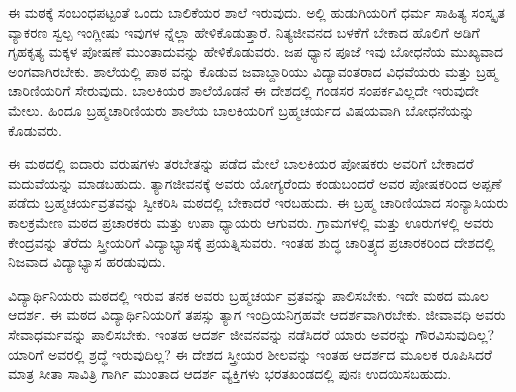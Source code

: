 ಈ ಮಠಕ್ಕೆ ಸಂಬಂಧಪಟ್ಟಂತೆ ಒಂದು ಬಾಲಿಕೆಯರ ಶಾಲೆ ಇರುವುದು. ಅಲ್ಲಿ ಹುಡುಗಿಯರಿಗೆ ಧರ್ಮ ಸಾಹಿತ್ಯ ಸಂಸ್ಕೃತ ವ್ಯಾಕರಣ ಸ್ವಲ್ಪ ಇಂಗ್ಲೀಷು ಇವುಗಳ ನ್ನೆಲ್ಲಾ ಹೇಳಿಕೊಡುತ್ತಾರೆ. ನಿತ್ಯಜೀವನದ ಬಳಕೆಗೆ ಬೇಕಾದ ಹೊಲಿಗೆ ಅಡಿಗೆ ಗೃಹಕೃತ್ಯ ಮಕ್ಕಳ ಪೋಷಣೆ ಮುಂತಾದುವನ್ನು ಹೇಳಿಕೊಡುವರು. ಜಪ ಧ್ಯಾನ ಪೂಜೆ ಇವು ಬೋಧನೆಯ ಮುಖ್ಯವಾದ ಅಂಗವಾಗಿರಬೇಕು. ಶಾಲೆಯಲ್ಲಿ ಪಾಠ ವನ್ನು ಕೊಡುವ ಜವಾಬ್ದಾರಿಯು ವಿದ್ಯಾವಂತರಾದ ವಿಧವೆಯರು ಮತ್ತು ಬ್ರಹ್ಮ ಚಾರಿಣಿಯರಿಗೆ ಸೇರುವುದು. ಬಾಲಕಿಯರ ಶಾಲೆಯೊಡನೆ ಈ ದೇಶದಲ್ಲಿ ಗಂಡಸರ ಸಂಪರ್ಕವಿಲ್ಲದೇ ಇರುವುದೇ ಮೇಲು. ಹಿಂದೂ ಬ್ರಹ್ಮಚಾರಿಣಿಯರು ಶಾಲೆಯ ಬಾಲಕಿಯರಿಗೆ ಬ್ರಹ್ಮಚರ್ಯದ ವಿಷಯವಾಗಿ ಬೋಧನೆಯನ್ನು ಕೊಡುವರು.

ಈ ಮಠದಲ್ಲಿ ಐದಾರು ವರುಷಗಳು ತರಬೇತನ್ನು ಪಡೆದ ಮೇಲೆ ಬಾಲಕಿಯರ ಪೋಷಕರು ಅವರಿಗೆ ಬೇಕಾದರೆ ಮದುವೆಯನ್ನು ಮಾಡಬಹುದು. ತ್ಯಾಗಜೀವನಕ್ಕೆ ಅವರು ಯೋಗ್ಯರೆಂದು ಕಂಡುಬಂದರೆ ಅವರ ಪೋಷಕರಿಂದ ಅಪ್ಪಣೆ ಪಡೆದು ಬ್ರಹ್ಮಚರ್ಯವ್ರತವನ್ನು ಸ್ವೀಕರಿಸಿ ಮಠದಲ್ಲಿ ಬೇಕಾದರೆ ಇರಬಹುದು. ಈ ಬ್ರಹ್ಮ ಚಾರಿಣಿಯಾದ ಸಂನ್ಯಾಸಿಯರು ಕಾಲಕ್ರಮೇಣ ಮಠದ ಪ್ರಚಾರಕರು ಮತ್ತು ಉಪಾ ಧ್ಯಾಯರು ಆಗುವರು. ಗ್ರಾಮಗಳಲ್ಲಿ ಮತ್ತು ಊರುಗಳಲ್ಲಿ ಅವರು ಕೇಂದ್ರವನ್ನು ತೆರೆದು ಸ್ತ್ರೀಯರಿಗೆ ವಿದ್ಯಾಭ್ಯಾಸಕ್ಕೆ ಪ್ರಯತ್ನಿಸುವರು. ಇಂತಹ ಶುದ್ಧ ಚಾರಿತ್ರ್ಯದ ಪ್ರಚಾರಕರಿಂದ ದೇಶದಲ್ಲಿ ನಿಜವಾದ ವಿದ್ಯಾಭ್ಯಾಸ ಹರಡುವುದು.

ವಿದ್ಯಾರ್ಥಿನಿಯರು ಮಠದಲ್ಲಿ ಇರುವ ತನಕ ಅವರು ಬ್ರಹ್ಮಚರ್ಯ ವ್ರತವನ್ನು ಪಾಲಿಸಬೇಕು. ಇದೇ ಮಠದ ಮೂಲ ಆದರ್ಶ. ಈ ಮಠದ ವಿದ್ಯಾರ್ಥಿನಿಯರಿಗೆ ತಪಸ್ಸು ತ್ಯಾಗ ಇಂದ್ರಿಯನಿಗ್ರಹವೇ ಆದರ್ಶವಾಗಿರಬೇಕು. ಜೀವಾವಧಿ ಅವರು ಸೇವಾಧರ್ಮವನ್ನು ಪಾಲಿಸಬೇಕು. ಇಂತಹ ಆದರ್ಶ ಜೀವನವನ್ನು ನಡೆಸಿದರೆ ಯಾರು ಅವರನ್ನು ಗೌರವಿಸುವುದಿಲ್ಲ? ಯಾರಿಗೆ ಅವರಲ್ಲಿ ಶ್ರದ್ಧೆ ಇರುವುದಿಲ್ಲ? ಈ ದೇಶದ ಸ್ತ್ರೀಯರ ಶೀಲವನ್ನು ಇಂತಹ ಆದರ್ಶದ ಮೂಲಕ ರೂಪಿಸಿದರೆ ಮಾತ್ರ ಸೀತಾ ಸಾವಿತ್ರಿ ಗಾರ್ಗಿ ಮುಂತಾದ ಆದರ್ಶ ವ್ಯಕ್ತಿಗಳು ಭರತಖಂಡದಲ್ಲಿ ಪುನಃ ಉದಯಿಸಬಹುದು.

